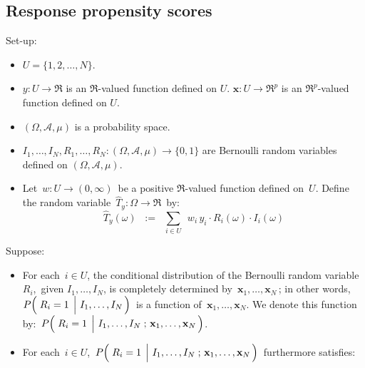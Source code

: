 

\subsection{Response propensity scores}

\begin{proposition}\label{PropnPropensityScore} 
\mbox{}\vskip 0.25cm
\noindent
Set-up:
\begin{itemize}
\item
	$U = \{1,2,\ldots,N\}$.
\item
	$y : U \longrightarrow \Re$ is an $\Re$-valued function defined on $U$.\;
	$\mathbf{x} : U \longrightarrow \Re^{p}$ is an $\Re^{p}$-valued function defined on $U$.
\item
	$(\Omega,\mathcal{A},\mu)$ is a probability space.
\item
	$I_{1},\ldots,I_{N},R_{1},\ldots,R_{N} : (\Omega,\mathcal{A},\mu) \longrightarrow \{0,1\}$
	are Bernoulli random variables defined on $(\Omega,\mathcal{A},\mu)$. 
\item
	Let \,$w : U \longrightarrow (0,\infty)$\, be a positive $\Re$-valued function defined on \,$U$.
	\vskip 0.05cm
	Define the random variable \,$\widehat{T}_{y} : \Omega \longrightarrow \Re$\, by:
	\begin{equation*}
	\widehat{T}_{y}(\omega)
	\;\; := \;\;
		\underset{i \in U}{\sum}\,\;w_{i}\,y_{i}\cdot R_{i}(\omega) \cdot I_{i}(\omega)
	\end{equation*}
\end{itemize}
Suppose:
\begin{itemize}
\item
	For each \,$i \in U$,
	{\color{red}the conditional distribution of the Bernoulli random variable
	\,$R_{i}$,\, given $I_{1},\ldots,I_{N}$, is completely determined by
	\,$\mathbf{x}_{1}, \ldots, \mathbf{x}_{N}$}\,;
	in other words,
	\,$P\!\left(\,\left.\overset{{\color{white}.}}{R_{i}}=1\;\,\right\vert\,I_{1},\ldots,I_{N}\,\right)$\,
	is a function of \,$\mathbf{x}_{1},\ldots,\mathbf{x}_{N}$.
	We denote this function by:
	\,$P\!\left(\,
		\left.\overset{{\color{white}.}}{R_{i}}=1\;\,\right\vert\,
		I_{1},\ldots,I_{N}\;;\,\mathbf{x}_{1},\ldots,\mathbf{x}_{N}
		\,\right)$.
\item
	For each \,$i \in U$,
	\,$P\!\left(\,
		\left.\overset{{\color{white}.}}{R_{i}}=1\;\,\right\vert\,
		I_{1},\ldots,I_{N}\;;\,\mathbf{x}_{1},\ldots,\mathbf{x}_{N}
		\,\right)$\,
	furthermore satisfies:
	\begin{equation*}

\end{equation*}
\end{itemize}
\end{proposition}
